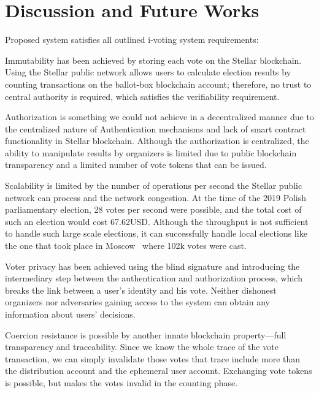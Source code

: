 \documentclass[applsci,article,submit,moreauthors,pdftex]{Definitions/mdpi}
\begin{document}

\section{Discussion and Future Works}
\label{discussion}

Proposed system satisfies all outlined i-voting system requirements: 

Immutability has been achieved by storing each vote on the Stellar blockchain. Using the Stellar public network allows users to calculate election results by counting transactions on the ballot-box blockchain account; therefore, no trust to central authority is required, which satisfies the verifiability requirement. 

Authorization is something we could not achieve in a decentralized manner due to the centralized nature of Authentication mechanisms and lack of smart contract functionality in Stellar blockchain. Although the authorization is centralized, the ability to manipulate results by organizers is limited due to public blockchain transparency and a limited number of vote tokens that can be issued. 

Scalability is limited by the number of operations per second the Stellar public network can process and the network congestion. At the time of the 2019 Polish parliamentary election, 28 votes per second were possible, and the total cost of such an election would cost 67.62USD.  Although the throughput is not sufficient to handle such large scale elections, it can successfully handle local elections like the one that took place in Moscow~\cite{gaudry2019breaking} where 102k votes were cast. 

Voter privacy has been achieved using the blind signature and introducing the intermediary step between the authentication and authorization process, which breaks the link between a user's identity and his vote. Neither dishonest organizers nor adversaries gaining access to the system can obtain any information about users' decisions. 

Coercion resistance is possible by another innate blockchain property––full transparency and traceability. Since we know the whole trace of the vote transaction, we can simply invalidate those votes that trace include more than the distribution account and the ephemeral user account. Exchanging vote tokens is possible, but makes the votes invalid in the counting phase.
\end{document}
